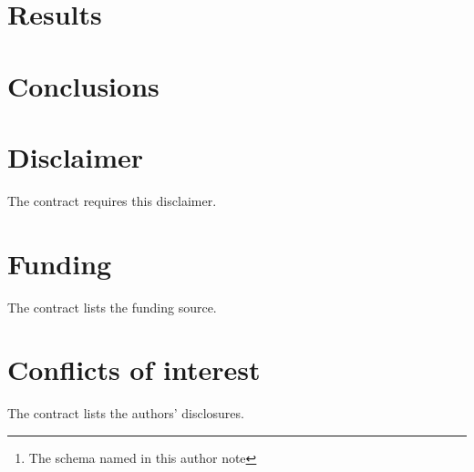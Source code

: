 \documentclass{article}
\author[one]{A1 \orcidlink{F2} \thanks{The schema named in this author note}}
\affiliation{organization={A3 Institute}, city={F4}}
\begin{document}
\begin{abstract}
The control sample was scanned before the primary experiment.
The experiment verified all membrane samples using independent readings.
The measured residual was \num{2e-8}.
We measured the change in uptake after adding the coating and compared the treated membrane with an untreated reference under the same flow conditions.
\end{abstract}
\section{Results}

\section{Conclusions}

\section*{Disclaimer}
The contract requires this disclaimer.
\section*{Funding}
The contract lists the funding source.
\section*{Conflicts of interest}
The contract lists the authors' disclosures.
\end{document}
